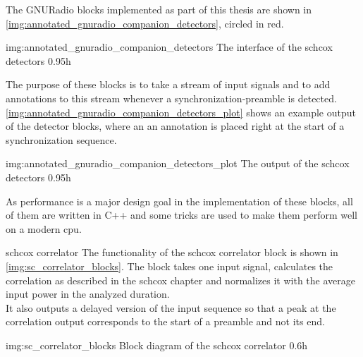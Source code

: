 The GNURadio blocks implemented as part of this thesis are
shown in \autoref{img:annotated_gnuradio_companion_detectors},
circled in red.

             {img:annotated_gnuradio_companion_detectors}
             {The interface of the \gls{schcox} detectors}
             {0.95}{h}

The purpose of these blocks is to take a stream of input signals
and to add annotations to this stream whenever a synchronization-preamble
is detected.
\autoref{img:annotated_gnuradio_companion_detectors_plot} shows an example output
of the detector blocks, where an an annotation is placed right at the start of a
synchronization sequence.

             {img:annotated_gnuradio_companion_detectors_plot}
             {The output of the \gls{schcox} detectors}
             {0.95}{h}

As performance is a major design goal in the implementation of these blocks,
all of them are written in C++ and some tricks are used to make them
perform well on a modern \acrshort{cpu}.

\begin{subchapter}{\acrlong{schcox} correlator}
  The functionality of the \acrlong{schcox} correlator
  block is shown in \autoref{img:sc_correlator_blocks}.
  The block takes one input signal, calculates the correlation
  as described in the \acrlong{schcox} chapter and normalizes it
  with the average input power in the analyzed duration. \\

  It also outputs a delayed version of the input sequence so that
  a peak at the correlation output corresponds to the start of a
  preamble and not its end.

               {img:sc_correlator_blocks}
               {Block diagram of the \acrlong{schcox} correlator}
               {0.6}{h}


\end{subchapter}


